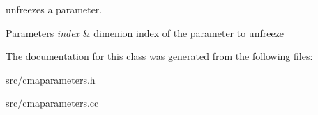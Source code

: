 unfreezes a parameter. 


\begin{DoxyParams}{Parameters}
{\em index} & dimenion index of the parameter to unfreeze \\
\hline
\end{DoxyParams}


The documentation for this class was generated from the following files\+:\begin{DoxyCompactItemize}
\item 
src/cmaparameters.\+h\item 
src/cmaparameters.\+cc\end{DoxyCompactItemize}
